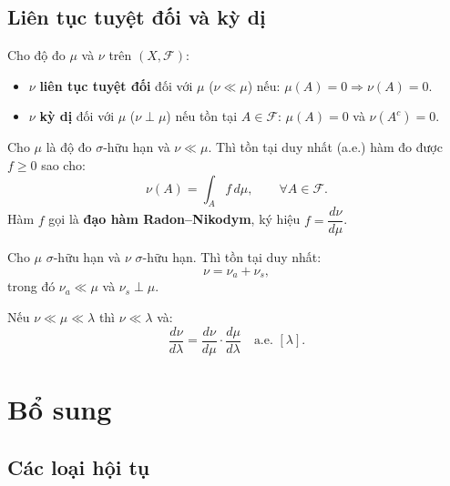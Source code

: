 \documentclass[12pt,a4paper]{article}
\begin{document}
\subsection{Liên tục tuyệt đối và kỳ dị}

\begin{dinhnghia}
  Cho độ đo $\mu$ và $\nu$ trên $(X, \mathcal{F})$:
  \begin{itemize}
    \item $\nu$ \textbf{liên tục tuyệt đối} đối với $\mu$ ($\nu \ll \mu$) nếu: $\mu(A) = 0 \Rightarrow \nu(A) = 0$.
    \item $\nu$ \textbf{kỳ dị} đối với $\mu$ ($\nu \perp \mu$) nếu tồn tại $A \in \mathcal{F}$: $\mu(A) = 0$ và $\nu(A^c) = 0$.
  \end{itemize}
\end{dinhnghia}

\begin{dinhly}[title={Định lý Radon--Nikodym}]
  Cho $\mu$ là độ đo $\sigma$-hữu hạn và $\nu \ll \mu$. Thì tồn tại duy nhất (a.e.) hàm đo được $f \ge 0$ sao cho:
  \[
    \nu(A) = \int_A f\,d\mu, \qquad \forall A \in \mathcal{F}.
  \]
  Hàm $f$ gọi là \textbf{đạo hàm Radon--Nikodym}, ký hiệu $f = \dfrac{d\nu}{d\mu}$.
\end{dinhly}

\begin{dinhly}[title={Phân tích Lebesgue}]
  Cho $\mu$ $\sigma$-hữu hạn và $\nu$ $\sigma$-hữu hạn. Thì tồn tại duy nhất:
  \[
    \nu = \nu_a + \nu_s,
  \]
  trong đó $\nu_a \ll \mu$ và $\nu_s \perp \mu$.
\end{dinhly}

\begin{congthuc}[title={Quy tắc dây chuyền}]
  Nếu $\nu \ll \mu \ll \lambda$ thì $\nu \ll \lambda$ và:
  \[
    \frac{d\nu}{d\lambda} = \frac{d\nu}{d\mu} \cdot \frac{d\mu}{d\lambda} \quad\text{a.e. } [\lambda].
  \]
\end{congthuc}

\section{Bổ sung}

\subsection{Các loại hội tụ}
\end{document}
